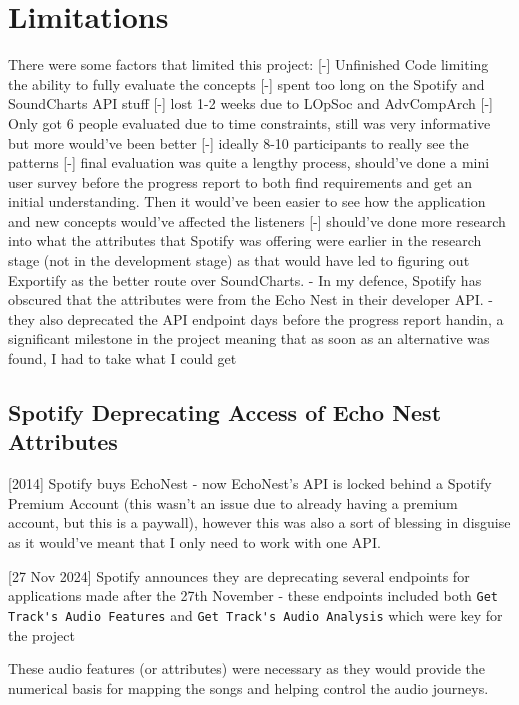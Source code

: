 \section{Limitations}
There were some factors that limited this project:
[-] Unfinished Code limiting the ability to fully evaluate the concepts
    [-] spent too long on the Spotify and SoundCharts API stuff
    [-] lost 1-2 weeks due to LOpSoc and AdvCompArch
[-] Only got 6 people evaluated due to time constraints, still was very informative but more would've been better
    [-] ideally 8-10 participants to really see the patterns
[-] final evaluation was quite a lengthy process, should've done a mini user survey before the progress report to both find requirements and get an initial understanding. Then it would've been easier to see how the application and new concepts would've affected the listeners
[-] should've done more research into what the attributes that Spotify was offering were earlier in the research stage (not in the development stage) as that would have led to figuring out Exportify as the better route over SoundCharts.
    - In my defence, Spotify has obscured that the attributes were from the Echo Nest in their developer API.
    - they also deprecated the API endpoint days before the progress report handin, a significant milestone in the project meaning that as soon as an alternative was found, I had to take what I could get

\subsection{Spotify Deprecating Access of Echo Nest Attributes}
[2014] Spotify buys EchoNest - now EchoNest's API is locked behind a Spotify Premium Account (this wasn't an issue due to already having a premium account, but this is a paywall), however this was also a sort of blessing in disguise as it would've meant that I only need to work with one API.
    
[27 Nov 2024] Spotify announces they are deprecating several endpoints for applications made after the 27th November - these endpoints included both \lstinline|Get Track's Audio Features| and \lstinline|Get Track's Audio Analysis| which were key for the project

These audio features (or attributes) were necessary as they would provide the numerical basis for mapping the songs and helping control the audio journeys.

